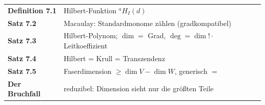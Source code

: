 \begin{merksatz}
\begin{center}
\renewcommand{\arraystretch}{1.5}
\begin{tabular}{@{}P{3.0cm}P{5.6cm}@{}}
\toprule
\textbf{Definition 7.1} & Hilbert-Funktion ${}^{a}\!H_I(d)$\\
\textbf{Satz 7.2} & Macaulay: Standardmonome zählen (gradkompatibel)\\
\textbf{Satz 7.3} & Hilbert-Polynom; $\dim = $ Grad, $\deg = \dim!\cdot$Leitkoeffizient\\
\textbf{Satz 7.4} & Hilbert = Krull = Transzendenz\\
\textbf{Satz 7.5} & Faserdimension $\ge\dim V - \dim W$, generisch $=$\\
\textbf{Der Bruchfall} & reduzibel: Dimension sieht nur die größten Teile\\
\bottomrule
\end{tabular}
\end{center}

\begin{center}
\begin{minipage}{0.88\textwidth}
\end{minipage}
\end{center}
\end{merksatz}
